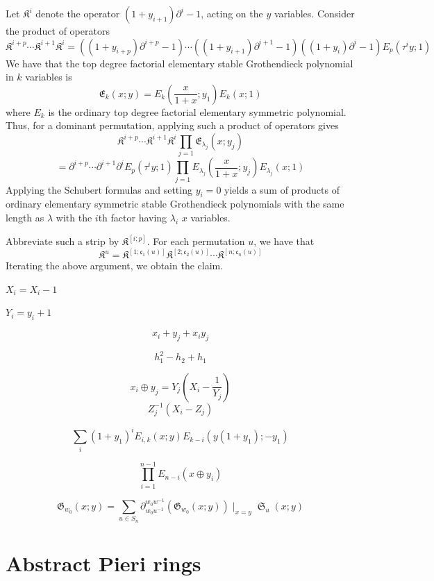 \documentclass{amsart}
\theoremstyle{definition}
\theoremstyle{remark}
\numberwithin{equation}{subsection}
\DeclareMathOperator{\sch}{\mathfrak{S}}
\newcommand{\groth}{\mathfrak{G}}
\newcommand{\code}{\mathfrak{c}}
\begin{document}
Let $\mathfrak{K}^i$ denote the operator $(1 + y_{i + 1})\partial^i - 1$, acting on the $y$ variables. Consider the product of operators
$$\mathfrak{K}^{i + p}\cdots \mathfrak{K}^{i + 1}\mathfrak{K}^{i} = ((1+ y_{i+p})\partial^{i+p} - 1)\cdots ((1 + y_{i+1})\partial^{i+1} - 1)((1 + y_i)\partial^i - 1)E_p(\tau^i y;1)$$
We have that the top degree factorial elementary stable Grothendieck polynomial in $k$ variables is
$$\mathfrak{E}_k(x;y) = E_{k}\left(\frac{x}{1 + x}; y_1\right)E_{k}(x; 1)$$
where $E_k$ is the ordinary top degree factorial elementary symmetric polynomial. Thus, for a dominant permutation, applying such a product of operators gives
$$\mathfrak{K}^{i + p}\cdots \mathfrak{K}^{i + 1}\mathfrak{K}^i\prod_{j = 1}\mathfrak{E}_{\lambda_j}(x;y_j)$$ 
$$=\partial^{i + p}\cdots \partial^{i + 1}\partial^iE_p(\tau^i y;1)\prod_{j=1}E_{\lambda_j}\left(\frac{x}{1 + x}; y_j\right)E_{\lambda_j}(x; 1)$$
Applying the Schubert formulas and setting $y_i=0$ yields a sum of products of ordinary elementary symmetric stable Grothendieck polynomials with the same length as $\lambda$ with the $i$th factor having $\lambda_i$ $x$ variables.

Abbreviate such a strip by $\mathfrak{K}^{[i;p]}$. For each permutation $u$, we have that
$$\mathfrak{K}^u = \mathfrak{K}^{[1; \code_1(u)]}\mathfrak{K}^{[2; \code_2(u)]}\cdots \mathfrak{K}^{[n; \code_n(u)]}$$
Iterating the above argument, we obtain the claim.


$X_i = X_i - 1$

$Y_i = y_i + 1$

$$x_i + y_j + x_iy_j$$

$$h_1^2 - h_2 + h_1$$

$$x_i\oplus y_j = Y_j(X_i - \frac 1{Y_j})$$
$$Z_j^{-1}(X_i - Z_j)$$

$$\sum_i (1+y_1)^i E_{i,k}(x;y)E_{k-i}(y(1+y_1);-y_1)$$

$$\prod_{i=1}^{n - 1} E_{n - i}(x\oplus y_i)$$

$$\groth_{w_0}(x;y) = \sum_{u\in S_n}\partial_{w_0u^{-1}}^{w_0w^{-1}}(\groth_{w_0}(x;y))\mid_{x=y}\sch_u(x;y)$$

\section{Abstract Pieri rings}

\end{document}
